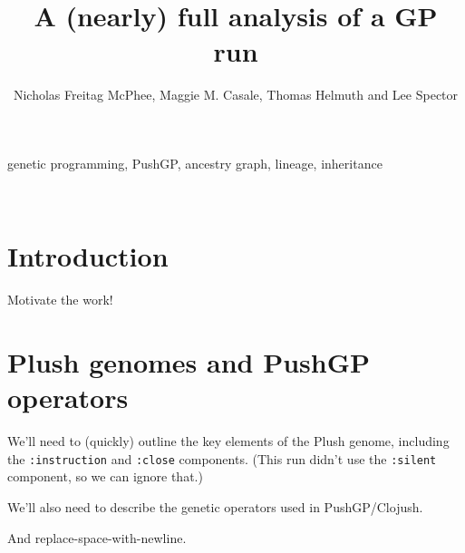 %

\title*{A (nearly) full analysis of a GP run}
\author{Nicholas Freitag McPhee, Maggie M. Casale, Thomas Helmuth and Lee Spector}

\maketitle


\begin{keywords}
	genetic programming, PushGP, ancestry graph, lineage, inheritance
\end{keywords}
\\
\section{Introduction}
\label{sec:introduction}

Motivate the work!

\section{Plush genomes and PushGP operators}
\label{sec:background}


We'll need to (quickly) outline the key elements of the Plush genome, including
the \texttt{:instruction} and \texttt{:close} components. (This run didn't use the
\texttt{:silent} component, so we can ignore that.)

We'll also need to describe the genetic operators used in PushGP/Clojush.

And replace-space-with-newline.

